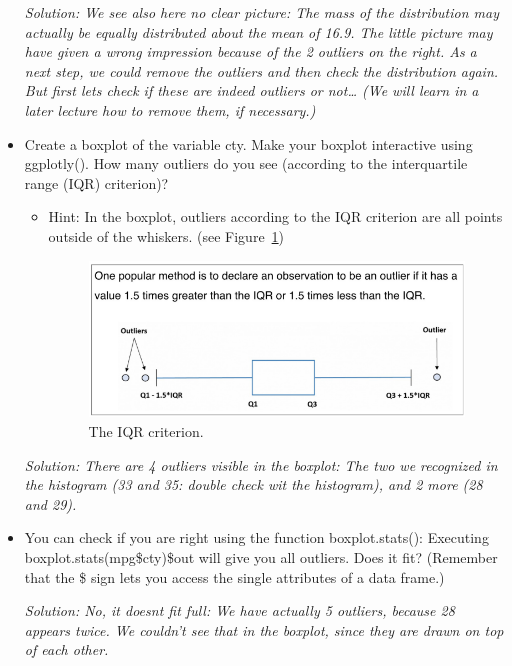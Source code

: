 \documentclass[
  letterpaper,
  DIV=11,
  numbers=noendperiod]{scrartcl}
\begin{document}
\begin{itemize}
  \emph{Solution: We see also here no clear picture: The mass of the
  distribution may actually be equally distributed about the mean of
  16.9. The little picture may have given a wrong impression because of
  the 2 outliers on the right. As a next step, we could remove the
  outliers and then check the distribution again. But first lets check
  if these are indeed outliers or not\ldots{} (We will learn in a later
  lecture how to remove them, if necessary.)}
\item
  Create a boxplot of the variable cty. Make your boxplot interactive
  using ggplotly(). How many outliers do you see (according to the
  interquartile range (IQR) criterion)?

  \begin{itemize}
  \item
    Hint: In the boxplot, outliers according to the IQR criterion are
    all points outside of the whiskers. (see
    Figure~\ref{fig-iqr-criterion})

    \begin{figure}

    {\centering \includegraphics[width=4.6875in,height=\textheight]{Materials L1/IQR criterion.PNG}

    }

    \caption{\label{fig-iqr-criterion}The IQR criterion.}

    \end{figure}
  \end{itemize}

  \emph{Solution: There are 4 outliers visible in the boxplot: The two
  we recognized in the histogram (33 and 35: double check wit the
  histogram), and 2 more (28 and 29).}
\item
  You can check if you are right using the function boxplot.stats():
  Executing boxplot.stats(mpg\$cty)\$out will give you all outliers.
  Does it fit? (Remember that the \$ sign lets you access the single
  attributes of a data frame.)

  \emph{Solution: No, it doesnt fit full: We have actually 5 outliers,
  because 28 appears twice. We couldn't see that in the boxplot, since
  they are drawn on top of each other.}
\end{itemize}
\end{document}
